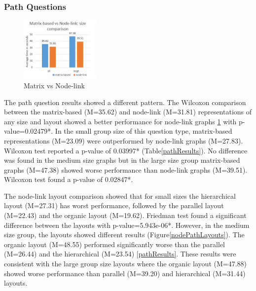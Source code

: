 \documentclass{l4proj}
\begin{document}
\subsubsection{Path Questions}

\begin{figure}
	\centering
	\vspace{-10mm}
    \includegraphics[width=0.35\textwidth]{images/pathComparison.PNG}
    \caption{Matrix vs Node-link} 
	\label{pathComparison}
\end{figure}

The path question results showed a different pattern. The Wilcoxon comparison between the matrix-based (M=35.62) and node-link (M=31.81) representations of any size and layout showed a better performance for node-link graphs \ref{pathComparison} with p-value=0.02479*. In the small group size of this question type, matrix-based representations (M=23.09) were outperformed by node-link graphs (M=27.83). Wilcoxon test reported a p-value of 0.03997* (Table\ref{pathResults}). No difference was found in the medium size graphs but in the large size group matrix-based graphs (M=47.38) showed worse performance than node-link graphs (M=39.51). Wilcoxon test found a p-value of 0.02847*. 

The node-link layout comparison showed that for small sizes the hierarchical layout (M=27.31) has worst performance, followed by the parallel layout (M=22.43) and the organic layout (M=19.62). Friedman test found a significant difference between the layouts with p-value=5.943e-06*. However, in the medium size group, the layouts showed different results (Figure\ref{nodePathLayouts}). The organic layout (M=48.55) performed significantly worse than the parallel (M=26.44) and the hierarchical (M=23.54) \ref{pathResults}. These results were consistent with the large group size layouts where the organic layout (M=47.88) showed worse performance than parallel (M=39.20) and hierarchical (M=31.44) layouts.
\end{document}
